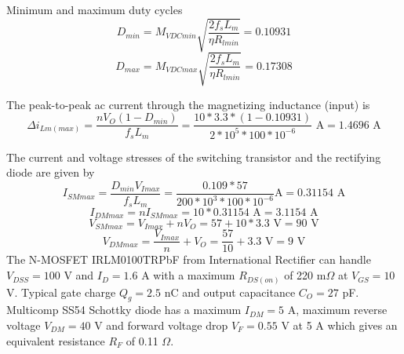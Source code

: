 Minimum and maximum duty cycles
\begin{equation}
D_{min}=M_{V DCmin} \sqrt{\frac{2 f_s L_m}{\eta R_{l min}}}=0.10931
\end{equation}
\begin{equation}
D_{max}=M_{V DCmax} \sqrt{\frac{2 f_s L_m}{\eta R_{l min}}}=0.17308
\end{equation}

The peak-to-peak ac current through the magnetizing inductance (input) is
\begin{equation}
\Delta i_{Lm(max)}=\frac{nV_O (1-D_{min})}{f_s L_m}
= \frac{10*3.3*(1-0.10931)}{2*10^5*100*10^{-6}} \text{ A} = 1.4696 \text{ A}
\end{equation}

The current and voltage stresses of the switching transistor and the
rectifying diode are given by
\begin{equation}
I_{SMmax} = \frac{D_{min}V_{Imax}}{f_s L_m} = \frac{0.109*57}{200*10^3*100*10^{-6}} \text{
A} = 0.31154 \text{ A}
\end{equation}
\begin{equation}
I_{DMmax} = nI_{SMmax} = 10*0.31154 \text{ A} = 3.1154 \text{ A}
\end{equation}
\begin{equation}
V_{SMmax} = V_{Imax} +nV_O = 57 + 10*3.3 \text{ V} = 90 \text{ V}
\end{equation}
\begin{equation}
V_{DMmax} = \frac{V_{Imax}}{n} + V_O = \frac{57}{10} + 3.3 \text{ V}
= 9 \text{ V}
\end{equation}
The N-MOSFET IRLM0100TRPbF from International Rectifier can handle
$V_{DSS}=100$ V and $I_D=1.6$ A with a maximum $R_{DS(on)}$ of 220
m$\Omega$ at $V_{GS}=10$ V. Typical gate charge $Q_g=2.5$ nC and
output capacitance $C_O=27$ pF. Multicomp SS54 Schottky diode has a
maximum $I_{DM}=5$ A, maximum reverse voltage $V_{DM}=40$ V and
forward voltage drop $V_F=0.55$ V at 5 A which gives an equivalent
resistance $R_F$ of 0.11 $\Omega$.

